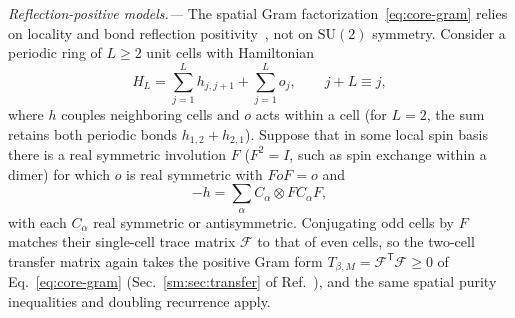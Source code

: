 \emph{Reflection-positive models.---}
The spatial Gram factorization~\eqref{eq:core-gram} relies on
locality and bond reflection positivity~\cite{Frohlich1978Phase,Jaffe2016Characterization},
not on $\mathrm{SU}(2)$ symmetry. Consider a periodic ring of $L\ge2$
unit cells with Hamiltonian
\begin{equation}
 H_L=\sum_{j=1}^L h_{j,j+1}+\sum_{j=1}^L o_j,
 \qquad j+L\equiv j,
 \label{scope:hamiltonian}
\end{equation}
where $h$ couples neighboring cells and $o$ acts within a cell (for
$L=2$, the sum retains both periodic bonds $h_{1,2}+h_{2,1}$).
Suppose that in some local spin basis there is a real symmetric
involution $F$ ($F^2=I$, such as spin exchange within a dimer) for
which $o$ is real symmetric with $FoF=o$ and
\begin{equation}
 -h=\sum_\alpha C_\alpha\otimes FC_\alpha F,
 \label{scope:rp}
\end{equation}
with each $C_\alpha$ real symmetric or antisymmetric. Conjugating odd
cells by $F$ matches their single-cell trace matrix $\mathcal F$ to
that of even cells, so the two-cell transfer matrix again takes the
positive Gram form $T_{\beta,M}=\mathcal F^{\mathsf T}\mathcal F\ge0$
of Eq.~\eqref{eq:core-gram} (Sec.~\ref{sm:sec:transfer} of
Ref.~\cite{SM}), and the same spatial purity inequalities and
doubling recurrence apply.

